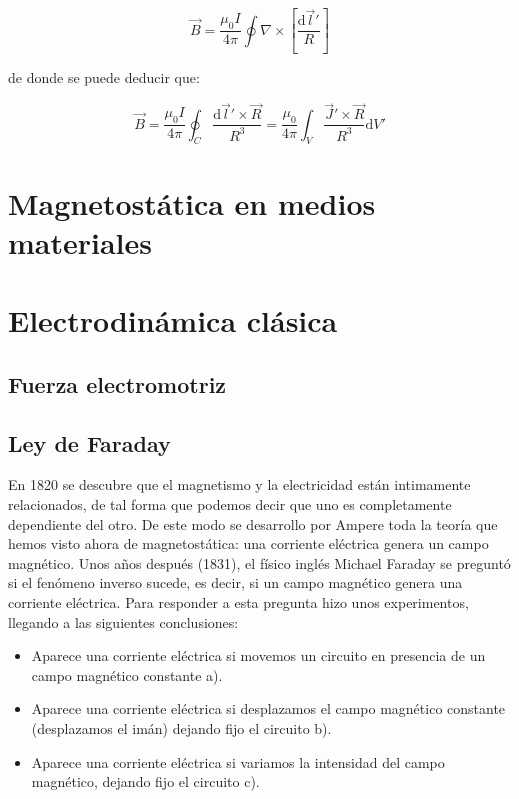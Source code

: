 \documentclass[12pt]{article}
\newcommand{\ccorchetes}[1]{\left[ #1  \right]}
\newcommand{\D}{\mathrm{d}}
\newcommand{\rota}{\nabla \times}
\begin{document}
$$ \vec{B} = \dfrac{\mu_0 I}{4 \pi} \oint  \rota \ccorchetes{\dfrac{\D \vec{l}'}{R}} $$


de donde se puede deducir que:

\begin{equation}
\vec{B} =  \dfrac{\mu_0 I}{4 \pi} \oint_C  \dfrac{\D \vec{l}' \times \vec{R}}{R^3} = \dfrac{\mu_0 }{4 \pi} \int_V  \dfrac{\vec{J}' \times \vec{R}}{R^3}  \D V'
\end{equation}




\newpage


\section{Magnetostática en medios materiales}
\newpage

\section{Electrodinámica clásica}

\subsection{Fuerza electromotriz}

\subsection{Ley de Faraday}

En 1820 se descubre que el magnetismo y la electricidad están intimamente relacionados, de tal forma que podemos decir que uno es completamente dependiente del otro. De este modo se desarrollo por Ampere toda la teoría que hemos visto ahora de magnetostática: una corriente eléctrica genera un campo magnético. Unos años después (1831), el físico inglés Michael Faraday se preguntó si el fenómeno inverso sucede, es decir, si un campo magnético genera una corriente eléctrica. Para responder a esta pregunta hizo unos experimentos, llegando a las siguientes conclusiones:

\begin{itemize}
\item Aparece una corriente eléctrica si movemos un circuito en presencia de un campo magnético constante a).

\item Aparece una corriente eléctrica si desplazamos el campo magnético constante (desplazamos el imán) dejando fijo el circuito b).

\item Aparece una corriente eléctrica si variamos la intensidad del campo magnético, dejando fijo el circuito c).
\end{itemize}
\end{document}

